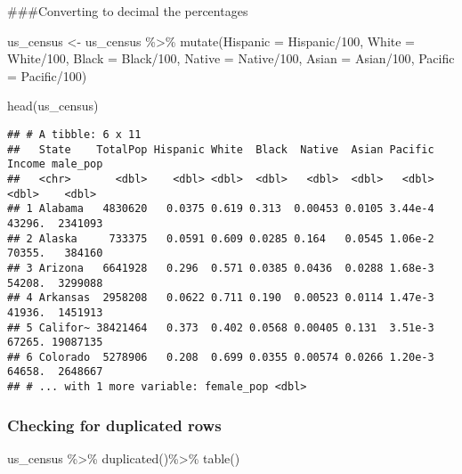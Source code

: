 \documentclass[
]{article}
\newenvironment{Shaded}{\begin{snugshade}}{\end{snugshade}}
\newcommand{\AttributeTok}[1]{\textcolor[rgb]{0.77,0.63,0.00}{#1}}
\newcommand{\DecValTok}[1]{\textcolor[rgb]{0.00,0.00,0.81}{#1}}
\newcommand{\FunctionTok}[1]{\textcolor[rgb]{0.00,0.00,0.00}{#1}}
\newcommand{\NormalTok}[1]{#1}
\newcommand{\OtherTok}[1]{\textcolor[rgb]{0.56,0.35,0.01}{#1}}
\newcommand{\SpecialCharTok}[1]{\textcolor[rgb]{0.00,0.00,0.00}{#1}}
\begin{document}
\#\#\#Converting to decimal the percentages

\begin{Shaded}
\begin{Highlighting}[]
\NormalTok{us\_census }\OtherTok{\textless{}{-}}\NormalTok{ us\_census }\SpecialCharTok{\%\textgreater{}\%}
  \FunctionTok{mutate}\NormalTok{(}\AttributeTok{Hispanic =}\NormalTok{ Hispanic}\SpecialCharTok{/}\DecValTok{100}\NormalTok{,}
         \AttributeTok{White =}\NormalTok{ White}\SpecialCharTok{/}\DecValTok{100}\NormalTok{,}
         \AttributeTok{Black =}\NormalTok{ Black}\SpecialCharTok{/}\DecValTok{100}\NormalTok{,}
         \AttributeTok{Native =}\NormalTok{ Native}\SpecialCharTok{/}\DecValTok{100}\NormalTok{,}
         \AttributeTok{Asian =}\NormalTok{ Asian}\SpecialCharTok{/}\DecValTok{100}\NormalTok{,}
         \AttributeTok{Pacific =}\NormalTok{ Pacific}\SpecialCharTok{/}\DecValTok{100}\NormalTok{)}

\FunctionTok{head}\NormalTok{(us\_census)}
\end{Highlighting}
\end{Shaded}

\begin{verbatim}
## # A tibble: 6 x 11
##   State    TotalPop Hispanic White  Black  Native  Asian Pacific Income male_pop
##   <chr>       <dbl>    <dbl> <dbl>  <dbl>   <dbl>  <dbl>   <dbl>  <dbl>    <dbl>
## 1 Alabama   4830620   0.0375 0.619 0.313  0.00453 0.0105 3.44e-4 43296.  2341093
## 2 Alaska     733375   0.0591 0.609 0.0285 0.164   0.0545 1.06e-2 70355.   384160
## 3 Arizona   6641928   0.296  0.571 0.0385 0.0436  0.0288 1.68e-3 54208.  3299088
## 4 Arkansas  2958208   0.0622 0.711 0.190  0.00523 0.0114 1.47e-3 41936.  1451913
## 5 Califor~ 38421464   0.373  0.402 0.0568 0.00405 0.131  3.51e-3 67265. 19087135
## 6 Colorado  5278906   0.208  0.699 0.0355 0.00574 0.0266 1.20e-3 64658.  2648667
## # ... with 1 more variable: female_pop <dbl>
\end{verbatim}

\hypertarget{checking-for-duplicated-rows}{%
\subsubsection{Checking for duplicated
rows}\label{checking-for-duplicated-rows}}

\begin{Shaded}
\begin{Highlighting}[]
\NormalTok{us\_census }\SpecialCharTok{\%\textgreater{}\%} \FunctionTok{duplicated}\NormalTok{()}\SpecialCharTok{\%\textgreater{}\%} \FunctionTok{table}\NormalTok{()}
\end{Highlighting}
\end{Shaded}
\end{document}

